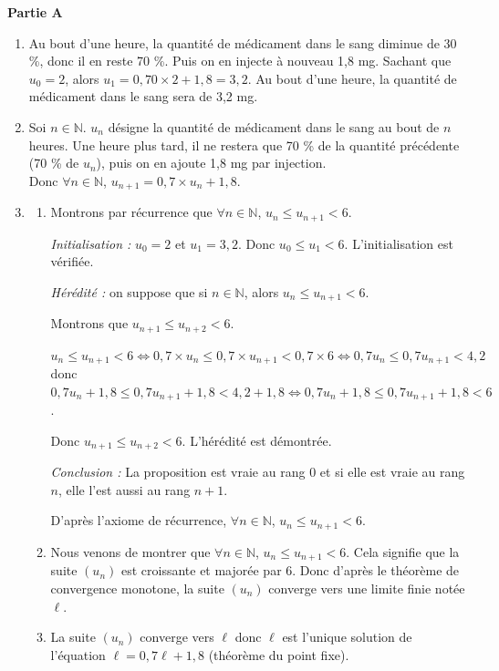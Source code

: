 \documentclass[10pt]{article}
\providecommand{\N}{\mathbb{N}}
\begin{document}
\medskip
\textbf{Partie A}
\medskip

\begin{enumerate}
	\item Au bout d'une heure, la quantité de médicament dans le sang diminue de 30 \%, donc il en reste 70 \%. Puis on en injecte à nouveau 1,8 mg. Sachant que $u_0=2$, alors $u_1=0,70\times 2+1,8=3,2$. Au bout d'une heure, la quantité de médicament dans le sang sera de 3,2 mg.
	\item Soi $n\in \N$. $u_n$ désigne la quantité de médicament dans le sang au bout de $n$ heures. Une heure plus tard, il ne restera que 70 \% de la quantité précédente (70 \% de $u_n$), puis on en ajoute 1,8 mg par injection.\\
	Donc $\forall n \in \N$, $u_{n+1}=0,7\times u_n+1,8$.
	\item \begin{enumerate}
		\item Montrons par récurrence que $\forall n \in \N$, $u_n\leqslant u_{n+1} <6$.
		
\textit{Initialisation :} $u_0=2$ et $u_1=3,2$. Donc $u_0\leqslant u_1<6$. L'initialisation est vérifiée.

\textit{Hérédité :} on suppose que si $n \in \N$, alors $u_n\leqslant u_{n+1} < 6$.
		
Montrons que $u_{n+1}\leqslant u_{n+2} < 6$.

$u_n\leqslant u_{n+1} < 6\iff 0,7 \times u_n\leqslant 0,7\times u_{n+1} <0,7 \times 6\iff 0,7 u_n\leqslant 0,7 u_{n+1} < 4,2$\\ donc $0,7 u_n+1,8\leqslant 0,7 u_{n+1}+ 1,8 < 4,2 + 1,8 \iff 0,7 u_n + 1,8 \leqslant 0,7 u_{n+1} + 1,8 < 6$.

Donc $u_{n+1}\leqslant u_{n+2}< 6$. L'hérédité est démontrée.

		\textit{Conclusion : }  La proposition est vraie au rang $0$ et si elle est vraie au rang $n$, elle l'est aussi au rang $n + 1$.
		
D'après l'axiome de récurrence, $\forall n \in \N$, $u_n\leqslant u_{n+1} < 6$.
		\item Nous venons de montrer que $\forall n \in \N$, $u_n\leqslant u_{n+1} < 6$. Cela signifie que la suite $\left(u_n\right)$ est croissante et majorée par 6. Donc d'après le théorème de convergence monotone, la suite $\left(u_n\right)$ converge vers une limite finie notée $\ell$.
		\item La suite $\left(u_n\right)$ converge vers $\ell$ donc $\ell$ est l'unique solution de l'équation $\ell = 0,7\ell + 1,8$ (théorème du point fixe).
		

\end{enumerate}
\end{enumerate}
\end{document}
